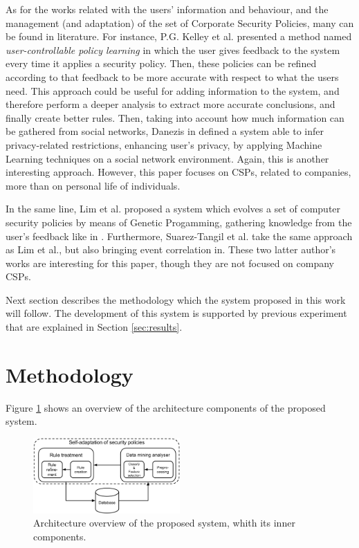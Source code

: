 \documentclass{sig-alternate}
\begin{document}
As for the works related with the users' information and behaviour, and the management (and adaptation) of the set of Corporate Security Policies, many can be found in literature. For instance, P.G. Kelley et al. \cite{user-controllable_learning_08} presented a method named \textit{user-controllable policy learning} in which the user gives feedback to the system every time it applies a security policy. Then, these policies can be refined according to that feedback to be more accurate with respect to what the users need. This approach could be useful for adding information to the system, and therefore perform a deeper analysis to extract more accurate conclusions, and finally create better rules.
Then, taking into account how much information can be gathered from social networks, Danezis in \cite{inferring_policies_socialnetworks_09} defined a system able to infer privacy-related restrictions, enhancing user's privacy, by applying Machine Learning techniques on a social network environment. Again, this is another interesting approach. However, this paper focuses on CSPs, related to companies, more than on personal life of individuals.

In the same line, Lim et al. proposed a system \cite{lim2008mls, lim2008policy} which evolves a set of computer security policies by means of Genetic Progamming, gathering knowledge from the user's feedback like in \cite{user-controllable_learning_08}. Furthermore, Suarez-Tangil et al. \cite{suarez2009automatic} take the same approach as Lim et al., but also bringing event correlation in. These two latter author's works are interesting for this paper, though they are not focused on company CSPs.

Next section describes the methodology which the system proposed in this work will follow. The development of this system is supported by previous experiment that are explained in Section \ref{sec:results}.

%
%
\section{Methodology}
\label{sec:methodology}

Figure \ref{fig:krs} shows an overview of the architecture components of the proposed system.

\begin{figure}
  \begin{center}
    \includegraphics[width=0.5\textwidth]{./img/KRSgecco.png}
    \caption{Architecture overview of the proposed system, whith its inner components.}
    \label{fig:krs}
  \end{center}
\end{figure}
\end{document}
